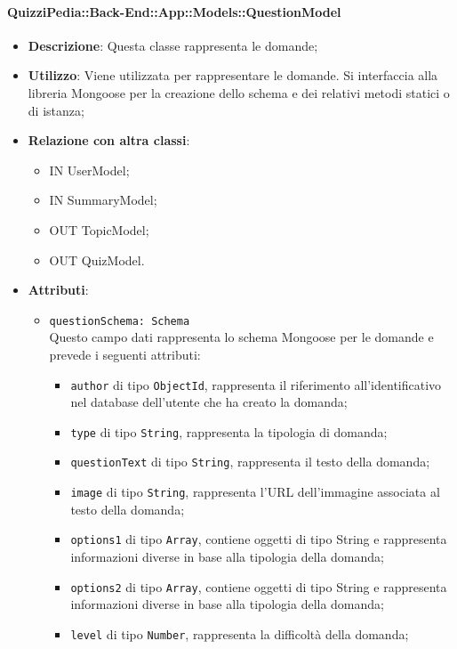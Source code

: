 \paragraph{QuizziPedia::Back-End::App::Models::QuestionModel}
\begin{itemize}
\item \textbf{Descrizione}: Questa classe rappresenta le domande;	
\item \textbf{Utilizzo}: Viene utilizzata per rappresentare le domande. Si interfaccia alla libreria Mongoose per la creazione dello schema e dei relativi metodi statici o di istanza;
\item \textbf{Relazione con altra classi}:
	\begin{itemize}
	\item IN UserModel;
	\item IN SummaryModel;
	\item OUT TopicModel;
	\item OUT QuizModel.
	\end{itemize}
\item \textbf{Attributi}:
	\begin{itemize}
	\item \texttt{questionSchema: Schema} \\
	Questo campo dati rappresenta lo schema Mongoose per le domande e prevede i 					seguenti attributi:
		\begin{itemize}
		\item \texttt{author} di tipo \texttt{ObjectId}, rappresenta il riferimento 					all'identificativo nel database dell'utente che ha creato la domanda;
		\item \texttt{type} di tipo \texttt{String}, rappresenta la tipologia di domanda;
		\item \texttt{questionText} di tipo \texttt{String}, rappresenta il testo della 				domanda; 
		\item \texttt{image} di tipo \texttt{String}, rappresenta l'URL dell'immagine 				associata al testo della domanda;
		\item \texttt{options1} di tipo \texttt{Array}, contiene oggetti di tipo String e 			rappresenta informazioni diverse in base alla tipologia della	 domanda;
		\item \texttt{options2} di tipo \texttt{Array}, contiene oggetti di tipo String e 			rappresenta informazioni diverse in base alla tipologia della	 domanda;
		\item \texttt{level} di tipo \texttt{Number}, rappresenta la difficoltà della 				domanda;

\end{itemize}
\end{itemize}
\end{itemize}
